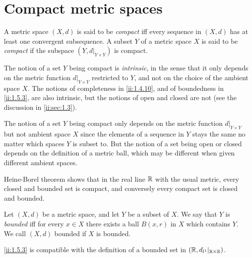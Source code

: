 \section{Compact metric spaces}\label{ii:sec:1.5}

\begin{defn}[Compactness]\label{ii:1.5.1}
  A metric space \((X, d)\) is said to be \emph{compact} iff every sequence in \((X, d)\) has at least one convergent subsequence.
  A subset \(Y\) of a metric space \(X\) is said to be \emph{compact} if the subspace \((Y, d|_{Y \times Y})\) is compact.
\end{defn}

\begin{rmk}\label{ii:1.5.2}
  The notion of a set \(Y\) being compact is \emph{intrinsic}, in the sense that it only depends on the metric function \(d|_{Y \times Y}\) restricted to \(Y\), and not on the choice of the ambient space \(X\).
  The notions of completeness in \cref{ii:1.4.10}, and of boundedness in \cref{ii:1.5.3}, are also intrinsic, but the notions of open and closed are not
  (see the discussion in \cref{ii:sec:1.3}).
\end{rmk}

\begin{note}
  The notion of a set \(Y\) being compact only depends on the metric function \(d|_{Y \times Y}\) but not ambient space \(X\) since the elements of a sequence in \(Y\) stays the same no matter which spaces \(Y\) is subset to.
  But the notion of a set being open or closed depends on the definition of a metric ball, which may be different when given different ambient spaces.
\end{note}

\begin{note}
  Heine-Borel theorem shows that in the real line \(\mathbb{R}\) with the usual metric, every closed and bounded set is compact, and conversely every compact set is closed and bounded.
\end{note}

\begin{defn}\label{ii:1.5.3}
  Let \((X, d)\) be a metric space, and let \(Y\) be a subset of \(X\).
  We say that \(Y\) is \emph{bounded} iff for every \(x \in X\) there exists a ball \(B(x, r)\) in \(X\) which contains \(Y\).
  We call \((X, d)\) bounded if \(X\) is bounded.
\end{defn}

\begin{rmk}\label{ii:1.5.4}
  \cref{ii:1.5.3} is compatible with the definition of a bounded set in \((\mathbb{R}, d_{l^1}|_{\mathbb{R} \times \mathbb{R}})\).
\end{rmk}

